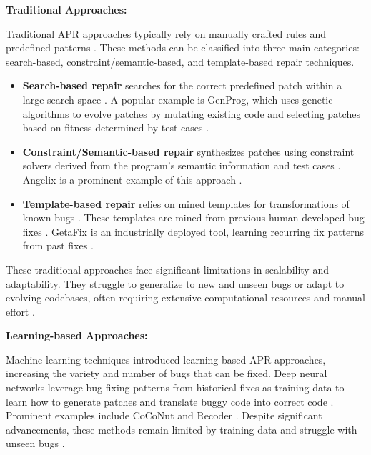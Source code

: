 \textbf{Traditional Approaches:}

Traditional APR approaches typically rely on manually crafted rules and predefined patterns \cite{liuMarsCodeAgentAInative2024, xiaAutomatedProgramRepair2023, yinThinkRepairSelfDirectedAutomated2024}. These methods can be classified into three main categories: search-based, constraint/semantic-based, and template-based repair techniques.

\begin{itemize}
    \item \textbf{Search-based repair} searches for the correct predefined patch within a large search space \cite{liuMarsCodeAgentAInative2024, huCanGPTO1Kill2024, zhangPATCHEmpoweringLarge2025}. A popular example is GenProg, which uses genetic algorithms to evolve patches by mutating existing code and selecting patches based on fitness determined by test cases \cite{legouesGenProgGenericMethod2012}.

    \item \textbf{Constraint/Semantic-based repair} synthesizes patches using constraint solvers derived from the program's semantic information and test cases \cite{liuMarsCodeAgentAInative2024, mechtaevAngelixScalableMultiline2016}. Angelix is a prominent example of this approach \cite{mechtaevAngelixScalableMultiline2016}.

    \item \textbf{Template-based repair} relies on mined templates for transformations of known bugs \cite{xiaAutomatedProgramRepair2023}. These templates are mined from previous human-developed bug fixes \cite{xiaAutomatedProgramRepair2023, yinThinkRepairSelfDirectedAutomated2024}. GetaFix is an industrially deployed tool, learning recurring fix patterns from past fixes \cite{baderGetafixLearningFix2019}.
\end{itemize}

These traditional approaches face significant limitations in scalability and adaptability. They struggle to generalize to new and unseen bugs or adapt to evolving codebases, often requiring extensive computational resources and manual effort \cite{puvvadiCodingAgentsComprehensive2025, xiaAutomatedProgramRepair2024}.

\textbf{Learning-based Approaches:}

Machine learning techniques introduced learning-based APR approaches, increasing the variety and number of bugs that can be fixed. Deep neural networks leverage bug-fixing patterns from historical fixes as training data to learn how to generate patches and translate buggy code into correct code \cite{xiaAutomatedProgramRepair2023, tangLargeLanguageModels2024}. Prominent examples include CoCoNut \cite{lutellierCoCoNuTCombiningContextaware2020} and Recoder \cite{zhuSyntaxguidedEditDecoder2021}. Despite significant advancements, these methods remain limited by training data and struggle with unseen bugs \cite{xiaLessTrainingMore2022}.

